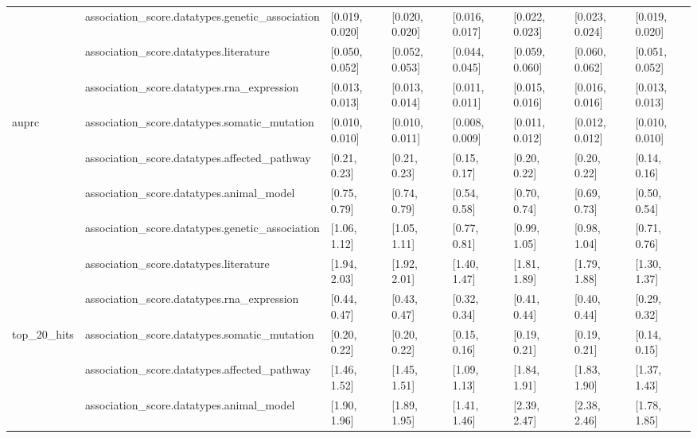 \begin{table}[H]
{\begin{tabular}{llllllll}
 & association\_score.datatypes.genetic\_association & [0.019, 0.020] & [0.020, 0.020] & [0.016, 0.017] & [0.022, 0.023] & [0.023, 0.024] & [0.019, 0.020]\\

 & association\_score.datatypes.literature & [0.050, 0.052] & [0.052, 0.053] & [0.044, 0.045] & [0.059, 0.060] & [0.060, 0.062] & [0.051, 0.052]\\

 & association\_score.datatypes.rna\_expression & [0.013, 0.013] & [0.013, 0.014] & [0.011, 0.011] & [0.015, 0.016] & [0.016, 0.016] & [0.013, 0.013]\\

\multirow{-6}{*}{\raggedright\arraybackslash auprc} & association\_score.datatypes.somatic\_mutation & [0.010, 0.010] & [0.010, 0.011] & [0.008, 0.009] & [0.011, 0.012] & [0.012, 0.012] & [0.010, 0.010]\\
\cmidrule{1-8}
 & association\_score.datatypes.affected\_pathway & [0.21, 0.23] & [0.21, 0.23] & [0.15, 0.17] & [0.20, 0.22] & [0.20, 0.22] & [0.14, 0.16]\\

 & association\_score.datatypes.animal\_model & [0.75, 0.79] & [0.74, 0.79] & [0.54, 0.58] & [0.70, 0.74] & [0.69, 0.73] & [0.50, 0.54]\\

 & association\_score.datatypes.genetic\_association & [1.06, 1.12] & [1.05, 1.11] & [0.77, 0.81] & [0.99, 1.05] & [0.98, 1.04] & [0.71, 0.76]\\

 & association\_score.datatypes.literature & [1.94, 2.03] & [1.92, 2.01] & [1.40, 1.47] & [1.81, 1.89] & [1.79, 1.88] & [1.30, 1.37]\\

 & association\_score.datatypes.rna\_expression & [0.44, 0.47] & [0.43, 0.47] & [0.32, 0.34] & [0.41, 0.44] & [0.40, 0.44] & [0.29, 0.32]\\

\multirow{-6}{*}{\raggedright\arraybackslash top\_20\_hits} & association\_score.datatypes.somatic\_mutation & [0.20, 0.22] & [0.20, 0.22] & [0.15, 0.16] & [0.19, 0.21] & [0.19, 0.21] & [0.14, 0.15]\\
\cmidrule{1-8}
 & association\_score.datatypes.affected\_pathway & [1.46, 1.52] & [1.45, 1.51] & [1.09, 1.13] & [1.84, 1.91] & [1.83, 1.90] & [1.37, 1.43]\\

 & association\_score.datatypes.animal\_model & [1.90, 1.96] & [1.89, 1.95] & [1.41, 1.46] & [2.39, 2.47] & [2.38, 2.46] & [1.78, 1.85]\\


\end{tabular}}
\end{table}
